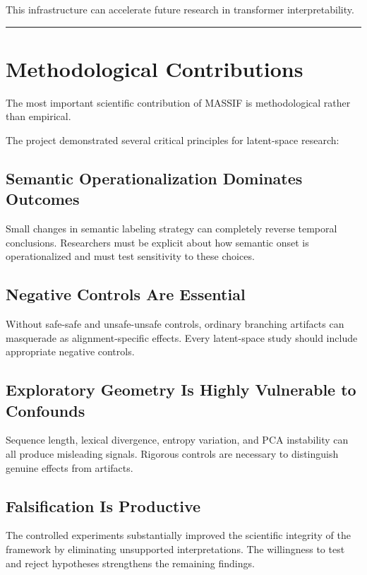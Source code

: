 \documentclass[12pt,a4paper]{article}
\begin{document}
This infrastructure can accelerate future research in transformer interpretability.

\medskip
\hrule
\medskip

\section{Methodological Contributions}

The most important scientific contribution of MASSIF is methodological rather than empirical.

The project demonstrated several critical principles for latent-space research:

\subsection*{Semantic Operationalization Dominates Outcomes}

Small changes in semantic labeling strategy can completely reverse temporal conclusions. Researchers must be explicit about how semantic onset is operationalized and must test sensitivity to these choices.

\subsection*{Negative Controls Are Essential}

Without safe-safe and unsafe-unsafe controls, ordinary branching artifacts can masquerade as alignment-specific effects. Every latent-space study should include appropriate negative controls.

\subsection*{Exploratory Geometry Is Highly Vulnerable to Confounds}

Sequence length, lexical divergence, entropy variation, and PCA instability can all produce misleading signals. Rigorous controls are necessary to distinguish genuine effects from artifacts.

\subsection*{Falsification Is Productive}

The controlled experiments substantially improved the scientific integrity of the framework by eliminating unsupported interpretations. The willingness to test and reject hypotheses strengthens the remaining findings.
\end{document}
